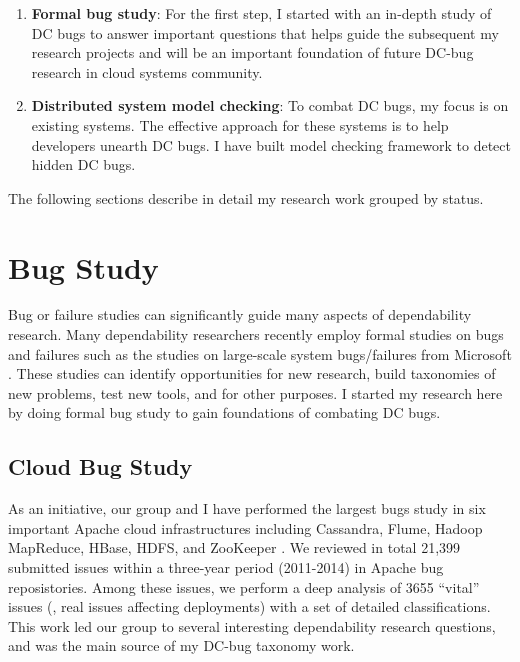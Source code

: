 \documentclass[11pt]{article}
\begin{document}
\begin{enumerate}

\item \textbf{Formal bug study}: For the first step, I started with an in-depth
study of DC bugs to answer important questions that helps guide the subsequent
my research projects and will be an important foundation of future DC-bug
research in cloud systems community.

\item \textbf{Distributed system model checking}: To combat DC bugs, my focus is
on existing systems. The effective approach for these systems is to help
developers unearth DC bugs. I have built model checking framework to detect
hidden DC bugs. 

\end{enumerate}

The following sections describe in detail my research work grouped by status.
\fi

\section{Bug Study}

Bug or failure studies can significantly guide many aspects of dependability
research. Many dependability researchers recently employ formal studies on bugs
and failures such as the studies on large-scale system bugs/failures from
Microsoft \cite{Guo+13-CureIsWorse, Li+13-ScopeBugStudy}. These studies can
identify opportunities for new research, build taxonomies of new problems, test
new tools, and for other purposes. I started my research here by doing formal
bug study to gain foundations of combating DC bugs.

\subsection{Cloud Bug Study}

As an initiative, our group and I have performed the largest bugs study in six
important Apache cloud infrastructures including Cassandra, Flume, Hadoop
MapReduce, HBase, HDFS, and ZooKeeper \cite{Gunawi+14-Cbs}. We
reviewed in total 21,399 submitted issues within a three-year period (2011-2014)
in Apache bug reposistories. Among these issues, we perform a deep analysis of
3655 ``vital'' issues (\ie, real issues affecting deployments) with a set of
detailed classifications. This work led our group to several interesting
dependability research questions, and was the main source of my DC-bug taxonomy
work.
\end{document}
